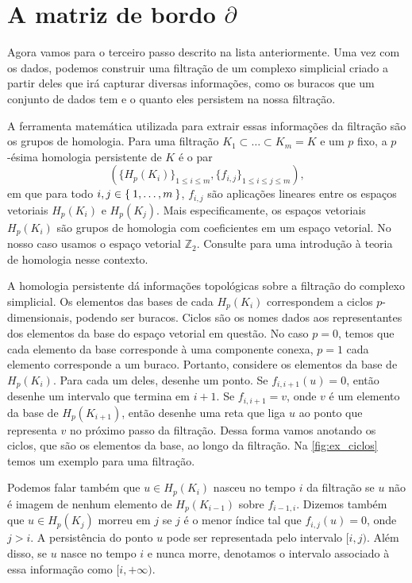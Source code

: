 \section{A matriz de bordo $\partial$}
Agora vamos para o terceiro passo descrito na lista anteriormente.
Uma vez com os dados, podemos construir uma filtração de um complexo simplicial
criado a partir deles que irá capturar diversas informações, como os buracos
que um conjunto de dados tem e o quanto eles persistem na nossa filtração.

A ferramenta matemática utilizada para extrair essas informações da filtração
são os grupos de homologia. Para uma filtração $K_1 \subset \dots \subset K_m=K$ e um
$p$ fixo, a $p$-ésima homologia persistente de $K$ é o par
\begin{equation}
  \label{eq:seq_hom}
  \left( \{H_p(K_i)\}_{1\leq i \leq m}, \{f_{i,j}\}_{1\leq i \leq j \leq m} \right),
\end{equation}
em que para todo $i,j \in \Set{1,\dots,m}$, $f_{i,j}$ são aplicações lineares
entre os espaços vetoriais $H_p(K_i)$ e $H_p(K_j)$. Mais especificamente,
os espaços vetoriais $H_p(K_i)$ são grupos de homologia com coeficientes
em um espaço vetorial. No nosso caso usamos o espaço vetorial $\mathbb{Z}_2$.
Consulte \cite{edelsbrunner2010computational} para uma introdução à teoria de homologia nesse contexto.

A homologia persistente dá informações topológicas sobre a filtração do complexo simplicial.
Os elementos das bases de cada $H_p(K_i)$ correspondem a ciclos $p$-dimensionais,
podendo ser buracos. Ciclos são os nomes dados aos representantes dos elementos da base
do espaço vetorial em questão. No caso $p=0$, temos que cada elemento da base corresponde
à uma componente conexa, $p=1$ cada elemento corresponde a um buraco.
Portanto, considere os elementos da base de $H_p(K_i)$. Para cada um deles,
desenhe um ponto. Se $f_{i,i+1}(u)=0$, então desenhe um intervalo que termina
em $i+1$. Se $f_{i,i+1}=v$, onde $v$ é um elemento da base de $H_p(K_{i+1})$,
então desenhe uma reta que liga $u$ ao ponto que representa $v$ no próximo passo
da filtração. Dessa forma vamos anotando os ciclos, que são os elementos da base,
ao longo da filtração. Na \autoref{fig:ex_ciclos} temos um exemplo para uma filtração.

Podemos falar também que $u\in H_p(K_i)$ nasceu no tempo $i$ da filtração se
$u$ não é imagem de nenhum elemento de $H_p(K_{i-1})$ sobre $f_{i-1,i}$.
Dizemos também que $u \in H_p(K_j)$ morreu em $j$ se $j$ é o menor índice tal que
$f_{i,j}(u) = 0$, onde $j>i$. A persistência do ponto $u$ pode ser representada pelo intervalo
$[i,j)$. Além disso, se $u$ nasce no tempo $i$ e nunca morre, denotamos o intervalo
associado à essa informação como $[i, +\infty)$.

